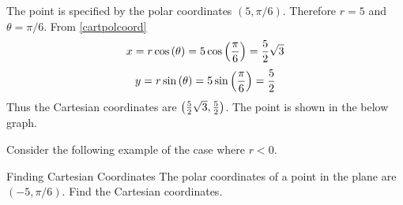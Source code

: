 \begin{solution}
The point is specified by the polar coordinates $\left( 5,\pi /6\right)$. Therefore $r=5$ and $\theta = \pi /6$. 
From \ref{cartpolcoord}
\[
x= r \cos \left( \theta \right)= 5\cos \left( \vspace{0.05in}\frac{\pi }{6}\right) = \vspace{0.05in}\frac{5}{2}\sqrt{3}
\]
\[
y= r \sin \left( \theta \right) = 5\sin \left( \vspace{0.05in}\frac{\pi }{6}\right) = \vspace{0.05in}\frac{5}{2}
\]
Thus the Cartesian coordinates are $\left( \vspace{0.05in}\frac{5}{2}\sqrt{3}, \vspace{0.05in}\frac{5}{2}\right)$. The point is shown in the below graph. 

\begin{center}
\end{center}
\end{solution}

Consider the following example of the case where $r < 0$. 

\begin{example}{Finding Cartesian Coordinates}{}
The polar coordinates of a point in the plane are $\left( -5,\pi /6\right) .$
Find the Cartesian coordinates.
\end{example}

